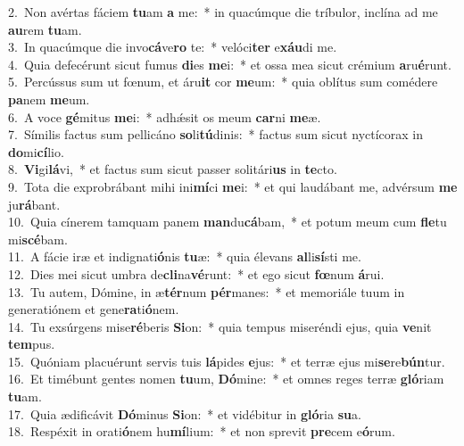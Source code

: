 {2.~}Non avértas fáciem \textbf{tu}am \textbf{a} me:~* in quacúmque die tríbulor, inclína ad me \textbf{au}rem \textbf{tu}am.\\
{3.~}In quacúmque die invo\textbf{cá}ve\textbf{ro} te:~* velóci\textbf{ter} e\textbf{xáu}di me.\\
{4.~}Quia defecérunt sicut fumus \textbf{di}es \textbf{me}i:~* et ossa mea sicut crémium \textbf{a}ru\textbf{é}runt.\\
{5.~}Percússus sum ut fœnum, et áru\textbf{it} cor \textbf{me}um:~* quia oblítus sum comédere \textbf{pa}nem \textbf{me}um.\\
{6.~}A voce \textbf{gé}mitus \textbf{me}i:~* adhǽsit os meum \textbf{car}ni \textbf{me}æ.\\
{7.~}Símilis factus sum pellicáno \textbf{so}li\textbf{tú}dinis:~* factus sum sicut nyctícorax in \textbf{do}mi\textbf{cí}lio.\\
{8.~}\textbf{Vi}gi\textbf{lá}vi,~* et factus sum sicut passer solitári\textbf{us} in \textbf{te}cto.\\
{9.~}Tota die exprobrábant mihi ini\textbf{mí}ci \textbf{me}i:~* et qui laudábant me, advérsum \textbf{me} ju\textbf{rá}bant.\\
{10.~}Quia cínerem tamquam panem \textbf{man}du\textbf{cá}bam,~* et potum meum cum \textbf{fle}tu mi\textbf{scé}bam.\\
{11.~}A fácie iræ et indignati\textbf{ó}nis \textbf{tu}æ:~* quia élevans \textbf{al}li\textbf{sí}sti me.\\
{12.~}Dies mei sicut umbra de\textbf{cli}na\textbf{vé}runt:~* et ego sicut \textbf{fœ}num \textbf{á}rui.\\
{13.~}Tu autem, Dómine, in æ\textbf{tér}num \textbf{pér}manes:~* et memoriále tuum in generatiónem et gene\textbf{ra}ti\textbf{ó}nem.\\
{14.~}Tu exsúrgens mise\textbf{ré}beris \textbf{Si}on:~* quia tempus miseréndi ejus, quia \textbf{ve}nit \textbf{tem}pus.\\
{15.~}Quóniam placuérunt servis tuis \textbf{lá}pides \textbf{e}jus:~* et terræ ejus mi\textbf{se}re\textbf{bún}tur.\\
{16.~}Et timébunt gentes nomen \textbf{tu}um, \textbf{Dó}mine:~* et omnes reges terræ \textbf{gló}riam \textbf{tu}am.\\
{17.~}Quia ædificávit \textbf{Dó}minus \textbf{Si}on:~* et vidébitur in \textbf{gló}ria \textbf{su}a.\\
{18.~}Respéxit in orati\textbf{ó}nem hu\textbf{mí}lium:~* et non sprevit \textbf{pre}cem e\textbf{ó}rum.\\
